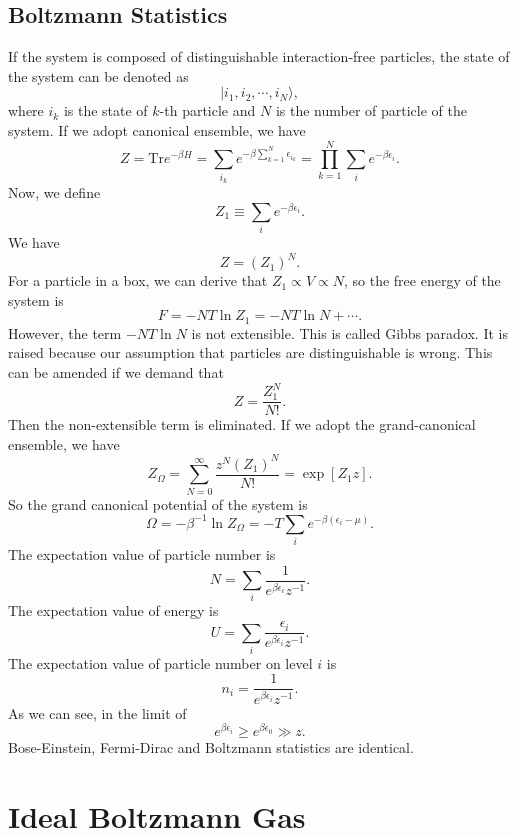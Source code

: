 \subsection{Boltzmann Statistics}
If the system is composed of distinguishable interaction-free particles, the state of the system can be denoted as
\[|i_1,i_2,\cdots,i_N\rangle,\] 
where $i_k$ is the state of $k$-th particle and $N$ is the number of particle of the system. 
If we adopt canonical ensemble, we have
\[Z =　\mathrm{Tr} e^{-\beta H} = \sum_{i_k} e^{-\beta\sum_{k=1}^N \epsilon_{i_k}} = \prod_{k=1}^N \sum_i e^{-\beta \epsilon_i}.\]
Now, we define
\[Z_1 \equiv \sum_i e^{-\beta \epsilon_i}.\] 
We have
\[Z = (Z_1)^N.\]
For a particle in a box, we can derive that $Z_1 \propto V \propto N$, so the free energy of the system is
\[F = -NT\ln Z_1 = -NT\ln N + \cdots.\]
However, the term $-NT\ln N$ is not extensible. This is called Gibbs paradox. It is raised because our assumption that particles are distinguishable is wrong. This can be amended if we demand that
\[Z = \frac{Z_1^N}{N!}.\]
Then the non-extensible term is eliminated.
If we adopt the grand-canonical ensemble, we have
\[Z_{\Omega} = \sum_{N=0}^{\infty} \frac{z^N (Z_1)^N}{N!} = \exp[Z_1 z].\]
So the grand canonical potential of the system is
\[\Omega = -\beta^{-1}\ln Z_{\Omega} = -T \sum_i e^{-\beta(\epsilon_i-\mu)}.\]
The expectation value of particle number is
\[N = \sum_i \frac{1}{e^{\beta \epsilon_i}z^{-1}}.\]
The expectation value of energy is
\[U = \sum_i \frac{\epsilon_i}{e^{\beta \epsilon_i}z^{-1}}.\]
The expectation value of particle number on level $i$ is
\[n_i =  \frac{1}{e^{\beta \epsilon_i}z^{-1}}.\]
As we can see, in the limit of
\[e^{\beta\epsilon_i} \geq e^{\beta\epsilon_0}  \gg z.\] Bose-Einstein, Fermi-Dirac and Boltzmann statistics are identical.  

\section{Ideal Boltzmann Gas}

